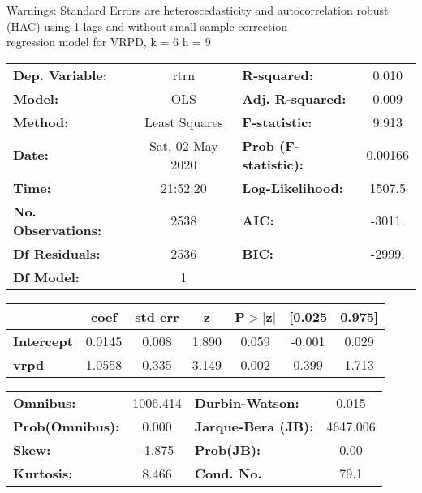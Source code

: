Warnings: \newline
 [1] Standard Errors are heteroscedasticity and autocorrelation robust (HAC) using 1 lags and without small sample correction\\ 

regression model for VRPD, k = 6 h = 9\begin{center}
\begin{tabular}{lclc}
\toprule
\textbf{Dep. Variable:}    &       rtrn       & \textbf{  R-squared:         } &     0.010   \\
\textbf{Model:}            &       OLS        & \textbf{  Adj. R-squared:    } &     0.009   \\
\textbf{Method:}           &  Least Squares   & \textbf{  F-statistic:       } &     9.913   \\
\textbf{Date:}             & Sat, 02 May 2020 & \textbf{  Prob (F-statistic):} &  0.00166    \\
\textbf{Time:}             &     21:52:20     & \textbf{  Log-Likelihood:    } &    1507.5   \\
\textbf{No. Observations:} &        2538      & \textbf{  AIC:               } &    -3011.   \\
\textbf{Df Residuals:}     &        2536      & \textbf{  BIC:               } &    -2999.   \\
\textbf{Df Model:}         &           1      & \textbf{                     } &             \\
\bottomrule
\end{tabular}
\begin{tabular}{lcccccc}
                   & \textbf{coef} & \textbf{std err} & \textbf{z} & \textbf{P$> |$z$|$} & \textbf{[0.025} & \textbf{0.975]}  \\
\midrule
\textbf{Intercept} &       0.0145  &        0.008     &     1.890  &         0.059        &       -0.001    &        0.029     \\
\textbf{vrpd}      &       1.0558  &        0.335     &     3.149  &         0.002        &        0.399    &        1.713     \\
\bottomrule
\end{tabular}
\begin{tabular}{lclc}
\textbf{Omnibus:}       & 1006.414 & \textbf{  Durbin-Watson:     } &    0.015  \\
\textbf{Prob(Omnibus):} &   0.000  & \textbf{  Jarque-Bera (JB):  } & 4647.006  \\
\textbf{Skew:}          &  -1.875  & \textbf{  Prob(JB):          } &     0.00  \\
\textbf{Kurtosis:}      &   8.466  & \textbf{  Cond. No.          } &     79.1  \\
\bottomrule
\end{tabular}
\end{center}

